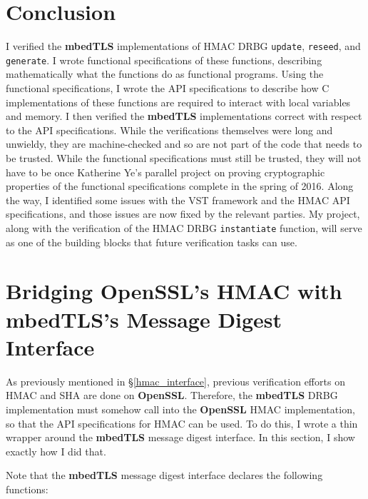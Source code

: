 \documentclass[pageno]{jpaper}
\newcommand{\stdtitle}[1]{\textbf{#1}}
\begin{document}
\section{Conclusion}

I verified the \stdtitle{mbedTLS} implementations of HMAC DRBG \lstinline{update}, \lstinline{reseed}, and \lstinline{generate}. I wrote functional specifications of these functions, describing mathematically what the functions do as functional programs. Using the functional specifications, I wrote the API specifications to describe how C implementations of these functions are required to interact with local variables and memory. I then verified the \stdtitle{mbedTLS} implementations correct with respect to the API specifications. While the verifications themselves were long and unwieldy, they are machine-checked and so are not part of the code that needs to be trusted. While the functional specifications must still be trusted, they will not have to be once Katherine Ye’s parallel project on proving cryptographic properties of the functional specifications complete in the spring of 2016. Along the way, I identified some issues with the VST framework and the HMAC API specifications, and those issues are now fixed by the relevant parties. My project, along with the verification of the HMAC DRBG \lstinline{instantiate} function, will serve as one of the building blocks that future verification tasks can use.




\clearpage
\appendix
\appendixpage
\section{Bridging OpenSSL’s HMAC with mbedTLS’s Message Digest Interface} \label{appendix_hmac}

As previously mentioned in \S \ref{hmac_interface}, previous verification efforts on HMAC and SHA are done on \stdtitle{OpenSSL}. Therefore, the \stdtitle{mbedTLS} DRBG implementation must somehow call into the \stdtitle{OpenSSL} HMAC implementation, so that the API specifications for HMAC can be used. To do this, I wrote a thin wrapper around the \stdtitle{mbedTLS} message digest interface. In this section, I show exactly how I did that.

Note that the \stdtitle{mbedTLS} message digest interface declares the following functions:
\end{document}
